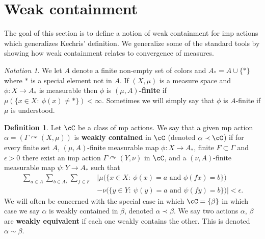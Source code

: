 \documentclass[12pt]{article}
\theoremstyle{plain}
\theoremstyle{definition}
\newtheorem{defn}{Definition}
\theoremstyle{remark}
\newtheorem{notation}{Notation}
\newcommand{\G}{\Gamma}
\newcommand{\eps}{\epsilon}
\renewcommand\a{\alpha}
\renewcommand\b{\beta}
\def\cc{{\curvearrowright}}
\begin{document}
\section{Weak containment}\label{S:weak-containment}




The goal of this section is to define a notion of weak containment for imp actions which generalizes Kechris' definition. We generalize some of the standard tools by showing how weak containment relates to convergence of measures.

\begin{notation}
    We let $A$ denote a finite non-empty set of colors and $A_*=A\cup\{*\}$ where $*$ is a special element not in $A$. If $(X,\mu)$ is a measure space and $\phi:X\to A_*$ is measurable then $\phi$ is {\bf $(\mu,A)$-finite} if $\mu(\{x\in X:~ \phi(x)\ne *\})<\infty$. Sometimes we will simply say that $\phi$ is $A$-finite if $\mu$ is understood.
\end{notation}


\begin{defn}
    Let $\cC$ be a class of mp actions. We say that a given mp action $\a=(\G \cc (X,\mu))$ is \textbf{weakly contained} in $\cC$ (denoted $\a\prec\cC$) if for every finite set $A$, $(\mu,A)$-finite measurable map $\phi:X \to A_*$, finite $F \subset \G$ and $\eps>0$ there exist an imp action $\G \cc (Y,\nu)$ in $\cC$, and a $(\nu,A)$-finite measurable map $\psi:Y \to A_*$ such that  
    \begin{align*}
        \sum_{a\in A} \sum_{b \in A_*} \sum_{f\in F}& \Big|\mu\big(\{x\in X:~ \phi(x)=a \textrm{ and } \phi(fx)=b\}\big)\\
        &- \nu\big(\{y\in Y:~ \psi(y)=a \textrm{ and } \psi(fy)=b\}\big)\Big|<\eps.
    \end{align*}
    We will often be concerned with the special case in which $\cC=\{\beta\}$ in which case we say $\a$ is weakly contained in $\beta$, denoted $\a\prec\b$. We say two actions $\a$, $\b$ are \textbf{weakly equivalent} if each one weakly contains the other. This is denoted $\a\sim \b$.
\end{defn}
\end{document}

